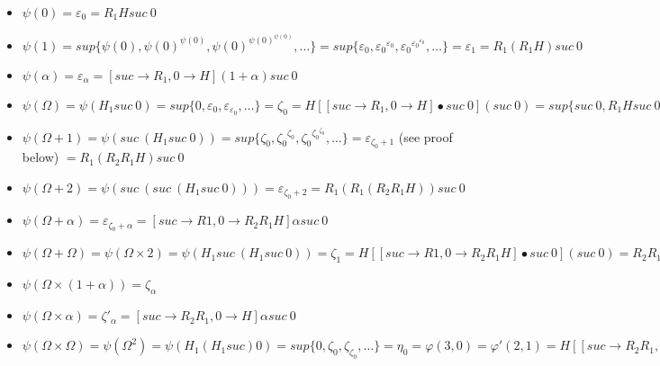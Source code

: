 \documentclass[10pt]{article}
\begin{document}
\begin{itemize}
     \setlength{\itemsep}{1pt}
     \setlength{\parskip}{0pt}
     \setlength{\parsep}{0pt}

\item \( \psi(0) = \varepsilon_0 = R_1 H suc\ 0 \)

\item \( \psi(1) = sup \lbrace \psi(0), \psi(0)^{\psi(0)}, \psi(0)^{\psi(0)^{\psi(0)}}, \ldots \rbrace = sup \lbrace \varepsilon_0, {\varepsilon_0}^{\varepsilon_0}, {\varepsilon_0}^{{\varepsilon_0}^{\varepsilon_0}}, \ldots \rbrace = \varepsilon_1 = R_1 (R_1 H) suc\ 0 \)

\item \( \psi(\alpha) = \varepsilon_\alpha = [suc \rightarrow R_1,0 \rightarrow H] (1+\alpha) suc\ 0 \)

\item \( \psi(\Omega) = \psi(H_1 suc\ 0) = sup \lbrace 0, \varepsilon_0, \varepsilon_{\varepsilon_0}, \ldots \rbrace = \zeta_0 = H [[suc \rightarrow R_1,0 \rightarrow H] \bullet suc\ 0] (suc\ 0) = sup \lbrace suc\ 0, R_1 H suc\ 0, R_1 H R_1 H suc\ 0, \ldots \rbrace = R_2 R_1 H suc\ 0 \)

\item \( \psi(\Omega+1) = \psi(suc\ (H_1 suc\ 0)) = sup \lbrace \zeta_0, {\zeta_0}^{\zeta_0}, {\zeta_0}^{{\zeta_0}^{\zeta_0}}, \ldots \rbrace = \varepsilon_{\zeta_0+1} \) (see proof below) \( = R_1 (R_2 R_1 H) suc\ 0 \)

\item \( \psi(\Omega+2) = \psi(suc\ (suc\ (H_1 suc\ 0))) = \varepsilon_{\zeta_0+2} = R_1 (R_1 (R_2 R_1 H)) suc\ 0 \)

\item \( \psi(\Omega+\alpha) = \varepsilon_{\zeta_0+\alpha} = [suc \rightarrow R1, 0 \rightarrow R_2 R_1 H] \alpha suc\ 0 \)

\item \( \psi(\Omega+\Omega) = \psi(\Omega \times 2) = \psi(H_1 suc\ (H_1 suc\ 0)) = \zeta_1 = H [[suc \rightarrow R1, 0 \rightarrow R_2 R_1 H] \bullet suc\ 0] (suc\ 0) = R_2 R_1 (R_2 R_1 H) suc\ 0 \)

\item \( \psi(\Omega \times (1+\alpha)) = \zeta_\alpha \)

\item \( \psi(\Omega \times \alpha) = \zeta'_\alpha = [suc \rightarrow R_2 R_1, 0 \rightarrow H] \alpha suc\ 0 \)

\item \( \psi(\Omega \times \Omega) = \psi(\Omega^2) = \psi (H_1 (H_1 suc) 0) = sup \lbrace 0, \zeta_0, \zeta_{\zeta_0}, \ldots \rbrace = \eta_0 = \varphi(3,0) = \varphi'(2,1) = H [[suc \rightarrow R_2 R_1, 0 \rightarrow H] \bullet suc\ 0] (suc\ 0) = R_2 (R_2 R_1) H suc\ 0 \)


\end{itemize}
\end{document}
